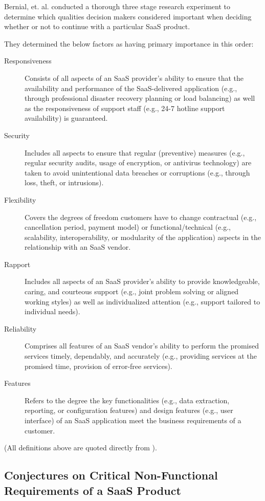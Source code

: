 \documentclass[10pt]{article}
\begin{document}
Bernial, et. al. conducted a thorough three stage research experiment to determine which qualities decision makers considered important when deciding whether or not to continue with a particular SaaS product.

They determined the below factors as having primary importance in this order:
\begin{description}
	\item[Responsiveness]
	Consists of all aspects of an SaaS provider’s ability to ensure that the availability and performance of the SaaS-delivered application (e.g., through professional disaster recovery planning or load balancing) as well as the responsiveness of support staff (e.g., 24-7 hotline support availability) is guaranteed.
	\item[Security]
	Includes all aspects to ensure that regular (preventive) measures (e.g., regular security audits, usage of encryption, or antivirus technology) are taken to avoid unintentional data breaches or corruptions (e.g., through loss, theft, or intrusions).
	\item[Flexibility]
	Covers the degrees of freedom customers have to change contractual (e.g., cancellation period, payment model) or functional/technical (e.g., scalability, interoperability, or modularity of the application) aspects in the relationship with an SaaS vendor.
	\item[Rapport]
	Includes all aspects of an SaaS provider’s ability to provide knowledgeable, caring, and courteous support (e.g., joint problem solving or aligned working styles) as well as individualized attention (e.g., support tailored to individual needs).
	\item[Reliability]
	Comprises all features of an SaaS vendor’s ability to perform the promised services timely, dependably, and accurately (e.g., providing services at the promised time, provision of error-free services).
	\item[Features]
	Refers to the degree the key functionalities (e.g., data extraction, reporting, or configuration features) and design features (e.g., user interface) of an SaaS application meet the business requirements of a customer.
\end{description}
(All definitions above are quoted directly from \cite{saasqual}).


\subsection{Conjectures on Critical Non-Functional Requirements of a SaaS Product}
\label{sec:Critical-EHR-Ilities}
\end{document}
